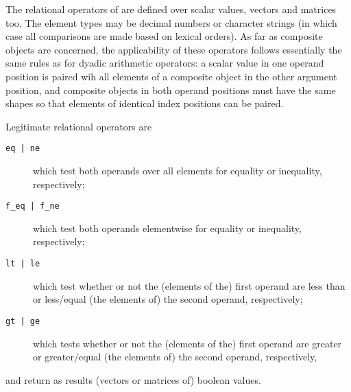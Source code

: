 The {\mys relational operators} of \kir are defined over scalar values,
vectors and matrices too. The element types may be decimal numbers or character strings (in which case all comparisons are made
based on lexical orders). As far as composite objects are
 concerned, the applicability of these operators follows
 essentially the same rules as for dyadic arithmetic operators:
a  scalar value in one operand position
is paired wih all elements of a composite object in the other
argument position, and composite objects in both operand positions
must have the same shapes so that elements of identical index
 positions can be paired.

Legitimate relational operators are
\begin{description}
\item[{\tt eq | ne}] which test both operands over all
elements for equality or inequality, respectively;
\item[{\tt f\_eq | f\_ne}] which test both operands elementwise
for equality or inequality, respectively;
\item[{\tt lt | le}] which test whether or not the (elements
 of the)
first operand are less than or less/equal (the elements of) the
 second operand, respectively;
\item[{\tt gt | ge}] which tests whether or not the (elements of the)
first operand are greater or greater/equal (the elements of) the
second operand, respectively,
\end{description}
and return  as results (vectors or matrices of) boolean values.

